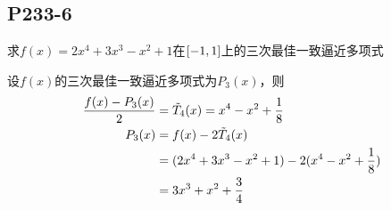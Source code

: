 \subsection{P233-6}
\renewcommand{\FX}{2 x^4 + 3 x^3 - x^2 + 1}
\renewcommand{\LRANGE}{-1}
\renewcommand{\RRANGE}{1}
求$f(x) = \FX$在$\RANGE$上的三次最佳一致逼近多项式
\begin{SOLVE}
设$f(x)$的三次最佳一致逼近多项式为$P_3(x)$，则
\begin{align*}
\frac{f(x) - P_3(x)}{2} & = \Tilde{T}_4(x) = x^4 - x^2 + \frac{1}{8}\\
P_3(x)                  & = f(x) - 2 \Tilde{T}_4(x)\\
                        & = (\FX) - 2 (x^4 - x^2 + \frac{1}{8})\\
                        & = 3 x^3 + x^2 + \frac{3}{4}
\end{align*}
\end{SOLVE}